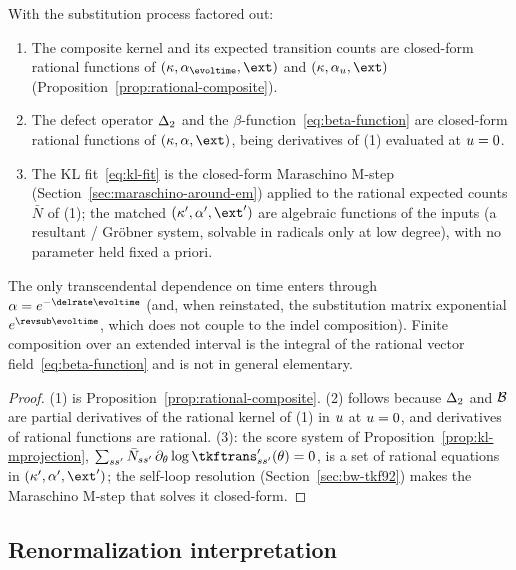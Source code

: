 \begin{proposition}
\label{prop:comp-algebraic}
With the substitution process factored out:
\begin{enumerate}[nosep]
\item The composite kernel and its expected transition counts are
  closed-form rational functions of $(\kappa,\alpha_\evoltime,\ext)$ and
  $(\kappa,\alpha_\evolu,\ext)$ (Proposition~\ref{prop:rational-composite}).
\item The defect operator $\Delta_2$ and the
  $\beta$-function~\eqref{eq:beta-function} are closed-form rational
  functions of $(\kappa,\alpha,\ext)$, being derivatives of (1) evaluated
  at $u=0$.
\item The KL fit~\eqref{eq:kl-fit} is the closed-form Maraschino M-step
  (Section~\ref{sec:maraschino-around-em}) applied to the rational expected
  counts $\bar N$ of (1); the matched $(\kappa',\alpha',\ext')$ are
  algebraic functions of the inputs (a resultant / Gr\"obner system,
  solvable in radicals only at low degree), with no parameter held fixed
  a priori.
\end{enumerate}
The only transcendental dependence on time enters through
$\alpha = e^{-\delrate\evoltime}$ (and, when reinstated, the substitution
matrix exponential $e^{\revsub\evoltime}$, which does not couple to the
indel composition).  Finite composition over an extended interval is the
integral of the rational vector field~\eqref{eq:beta-function} and is not
in general elementary.
\end{proposition}

\begin{proof}
(1) is Proposition~\ref{prop:rational-composite}.  (2) follows because
$\Delta_2$ and $\mathcal{B}$ are partial derivatives of the rational kernel
of (1) in $u$ at $u=0$, and derivatives of rational functions
are rational.  (3): the score system of
Proposition~\ref{prop:kl-mprojection},
$\sum_{ss'}\bar N_{ss'}\,\partial_\theta\log\tkftrans'_{ss'}(\theta)=0$,
is a set of rational equations in $(\kappa',\alpha',\ext')$; the self-loop
resolution (Section~\ref{sec:bw-tkf92}) makes the Maraschino M-step that
solves it closed-form.
\end{proof}

\subsection{Renormalization interpretation}
\label{sec:comp-rg}

